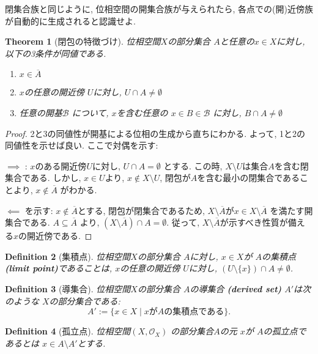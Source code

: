 \documentclass[lualatex]{ltjsbook}
\newcommand{\cl}[1]{\overline{ #1}  }
\newtheorem{theorem}{Theorem}[chapter]
\newtheorem{definition}[theorem]{Definition}
\theoremstyle{remark}
\theoremstyle{plain}
\begin{document}
閉集合族と同じように,  位相空間の開集合族が与えられたら,  各点での(開)近傍族が自動的に生成されると認識せよ.

\begin{theorem}[閉包の特徴づけ]
	位相空間$X$の部分集合 $A$と任意の$x \in X$に対し,  以下の3条件が同値である.
	 \begin{enumerate}
		\item $x \in \cl{A}$
		\item  $x$の任意の開近傍 $U$に対し,   $U\cap A \neq \emptyset$
		\item  任意の開基$\mathcal{B}$ について,  $x$を含む任意の $ x \in B \in \mathcal{B}$ に対し,  $B\cap A \neq \emptyset$
	\end{enumerate}
\end{theorem}


\begin{proof}
	2と3の同値性が開基による位相の生成から直ちにわかる. よって,  1と2の同値性を示せば良い.
ここで対偶を示す:

$\implies$ : $x$のある開近傍$U$に対し,   $U \cap A = \emptyset$ とする. 
この時,   $X \setminus U$は集合$A$を含む閉集合である. 
しかし,   $x \in U $より,  $x \not\in X \setminus U$,  閉包が$A$を含む最小の閉集合であることより,  $x \not\in \cl{A}$ がわかる.

$\impliedby$ を示す: $x \not\in \cl{A} $とする,  閉包が閉集合であるため,  $X \setminus \cl{A}$が$x \in X \setminus \cl{A}$ を満たす開集合である. 
$A \subseteq \cl{A}$ より,  $\left( X\setminus \cl{A} \right) \cap A = \emptyset$. 
従って,  $X \setminus \cl{A}$が示すべき性質が備える$x$の開近傍である.
	
\end{proof}


\begin{definition}[集積点]
	位相空間$X$の部分集合 $A$に対し,   $x \in X$が $A$の集積点\textbf{(limit point)}であることは, 
$x$の任意の開近傍 $U$に対し,   $\left( U\setminus \{x\}  \right) \cap A \neq \emptyset $.
\end{definition}

\begin{definition}[導集合]
	位相空間$X$の部分集合 $A$の導集合 \textbf{(derived set)} $A'$は次のような $X$の部分集合である:
	 \[
	A' := \{x \in X  \mid  x がAの集積点である\} 
	.\] 
\end{definition}

\begin{definition}[孤立点]
	位相空間$\left( X ,  \mathcal{O}_{X} \right)$ の部分集合$A$の元 $x$が $A$の孤立点であるとは $x \in  A\setminus A'$とする.
\end{definition}
\end{document}
